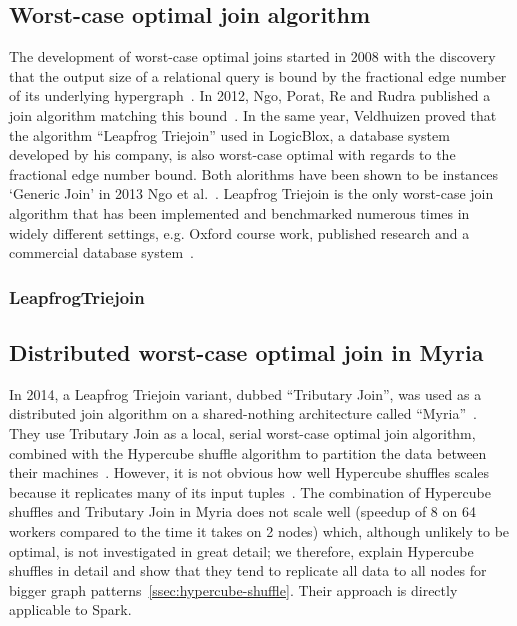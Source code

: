 \subsection{Worst-case optimal join algorithm}\label{subsec:worst-case-optimal-join-algorithm}
The development of worst-case optimal joins started in 2008 with the discovery that the output size of a relational query is bound by the fractional edge number of its underlying hypergraph~\cite{agm}.
In 2012, Ngo, Porat, Re and Rudra published a join algorithm matching this bound~\cite{nprr}.
In the same year, Veldhuizen proved that the algorithm ``Leapfrog Triejoin'' used in LogicBlox, a database system developed by his company, is also worst-case optimal with regards to the
fractional edge number bound.
Both alorithms have been shown to be instances `Generic Join' in 2013 Ngo et al.~\cite{skew-strikes-back}.
Leapfrog Triejoin is the only worst-case join algorithm that has been implemented and benchmarked numerous times in widely different settings, e.g. Oxford course work, published research and a commercial database system~\cite{leapfrog,andreas,olddog,myria,ammar2018distributed,leapfrog-triejoin-schroeder}.

\subsubsection{LeapfrogTriejoin}

\subsection{Distributed worst-case optimal join in Myria}
In 2014, a Leapfrog Triejoin variant, dubbed ``Tributary Join'', was used as a distributed join algorithm on a shared-nothing architecture called ``Myria''~\cite{myria-detailed}.
They use Tributary Join as a local, serial worst-case optimal join algorithm, combined with the Hypercube shuffle algorithm to partition the data between their machines~\cite{hypercube}.
However, it is not obvious how well Hypercube shuffles scales because it replicates many of its input tuples~\cite{myria-detailed}.
The combination of Hypercube shuffles and Tributary Join in Myria does not scale well (speedup of 8 on 64 workers compared to the time it takes on 2 nodes) which, although unlikely to be optimal, is not investigated in great detail; we therefore, explain Hypercube shuffles in detail and show that they tend to replicate all data to all nodes for bigger graph patterns~\cref{ssec:hypercube-shuffle}.
Their approach is directly applicable to Spark.

